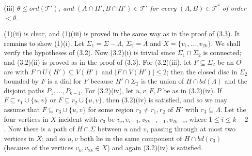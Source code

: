 \hspace*{12pt}(iii) \textit{$\theta \le ord(\mathscr{T}')$, and $(A \cap H', B \cap H') \in \mathscr{T}'$ for every $(A, B) \in \mathscr{T}^*$ of order $< \theta$.}

(1)(ii) is clear, and (1)(iii) is proved in the same way as in the proof of (3.3). It remains to show (1)(i). Let $\Sigma_1 = \Sigma - \Lambda$, $\Sigma_2 = \bar{\Lambda}$ and $X = \{v_1, \dots, v_{2k}\}$. We shall verify the hypotheses of (3.2). Now (3.2)(i) is trivial since $\Sigma_1 \cap \Sigma_2$ is connected; and (3.2)(ii) is proved as in the proof of (3.3). For (3.2)(iii), let $F \subseteq \Sigma_2$ be an $O$-arc with $F \cap U(H') \subseteq V(H')$ and $|F \cap V(H')| \le 2$; then the closed disc in $\Sigma_2$ bounded by $F$ is a dial for $F$ because $H' \cap \Sigma_2$ is the union of $H \cap bd(\Lambda)$ and the disjoint paths $P_1, \dots, P_{k-1}$. For (3.2)(iv), let $u, v, F, P$ be as in (3.2)(iv). If $F \subseteq r_1 \cup \{u, v\}$ or $F \subseteq r_2 \cup \{u, v\}$, then (3.2)(iv) is satisfied, and so we may assume that $F \subseteq r_3 \cup \{u, v\}$ for some region $r_3 \ne r_1, r_2$ of $H'$ with $r_3 \subseteq \Lambda$. Let the four vertices in $X$ incident with $r_3$ be $v_i, v_{i+1}, v_{2k-i-1}, v_{2k-i}$, where $1 \le i \le k - 2$. Now there is a path of $H \cap \Sigma$ between $u$ and $v$, passing through at most two vertices in $X$; and so $u, v$ both lie in the same component of $H \cap bd(r_3)$ (because of the vertices $v_k, v_{2k} \in X$) and again (3.2)(iv) is satisfied. 
